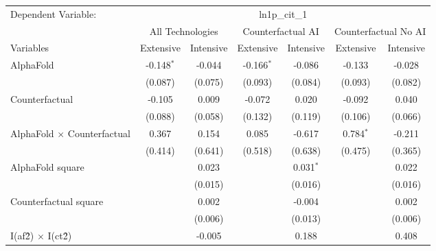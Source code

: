\begingroup
\centering
\begin{tabular}{lcccccc}
   \tabularnewline \midrule \midrule
   Dependent Variable: & \multicolumn{6}{c}{ln1p\_cit\_1}\\
 & \multicolumn{2}{c}{All Technologies} & \multicolumn{2}{c}{Counterfactual AI} & \multicolumn{2}{c}{Counterfactual No AI} \\
\cmidrule(lr){1-1}\cmidrule(lr){2-3} \cmidrule(lr){4-5} \cmidrule(lr){6-7}
Variables & \multicolumn{1}{c}{Extensive} & \multicolumn{1}{c}{Intensive} & \multicolumn{1}{c}{Extensive} & \multicolumn{1}{c}{Intensive} & \multicolumn{1}{c}{Extensive} & \multicolumn{1}{c}{Intensive} \\
\cmidrule(lr){1-1}\cmidrule(lr){2-2} \cmidrule(lr){3-3} \cmidrule(lr){4-4} \cmidrule(lr){5-5} \cmidrule(lr){6-6} \cmidrule(lr){7-7}
   AlphaFold                          & -0.148$^{*}$ & -0.044  & -0.166$^{*}$ & -0.086      & -0.133      & -0.028\\   
                                      & (0.087)      & (0.075) & (0.093)      & (0.084)     & (0.093)     & (0.082)\\   
   Counterfactual                     & -0.105       & 0.009   & -0.072       & 0.020       & -0.092      & 0.040\\   
                                      & (0.088)      & (0.058) & (0.132)      & (0.119)     & (0.106)     & (0.066)\\   
   AlphaFold $\times$ Counterfactual  & 0.367        & 0.154   & 0.085        & -0.617      & 0.784$^{*}$ & -0.211\\   
                                      & (0.414)      & (0.641) & (0.518)      & (0.638)     & (0.475)     & (0.365)\\   
   AlphaFold square                   &              & 0.023   &              & 0.031$^{*}$ &             & 0.022\\   
                                      &              & (0.015) &              & (0.016)     &             & (0.016)\\   
   Counterfactual square              &              & 0.002   &              & -0.004      &             & 0.002\\   
                                      &              & (0.006) &              & (0.013)     &             & (0.006)\\   
   I(af\^2) $\times$ I(ct\^2)         &              & -0.005  &              & 0.188       &             & 0.408\\   

\end{tabular}
